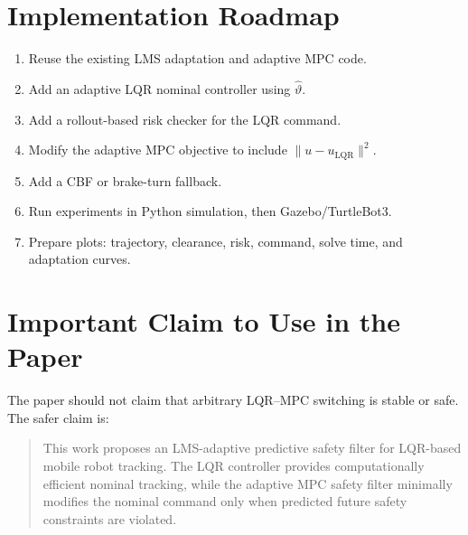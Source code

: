 \documentclass[11pt,a4paper]{article}
\begin{document}
\section{Implementation Roadmap}
\begin{enumerate}
    \item Reuse the existing LMS adaptation and adaptive MPC code.
    \item Add an adaptive LQR nominal controller using $\hat{\vartheta}$.
    \item Add a rollout-based risk checker for the LQR command.
    \item Modify the adaptive MPC objective to include $\|u-u_{\mathrm{LQR}}\|^2$.
    \item Add a CBF or brake-turn fallback.
    \item Run experiments in Python simulation, then Gazebo/TurtleBot3.
    \item Prepare plots: trajectory, clearance, risk, command, solve time, and adaptation curves.
\end{enumerate}

\section{Important Claim to Use in the Paper}
The paper should not claim that arbitrary LQR--MPC switching is stable or safe. The safer claim is:

\begin{quote}
This work proposes an LMS-adaptive predictive safety filter for LQR-based mobile robot tracking. The LQR controller provides computationally efficient nominal tracking, while the adaptive MPC safety filter minimally modifies the nominal command only when predicted future safety constraints are violated.
\end{quote}
\end{document}

